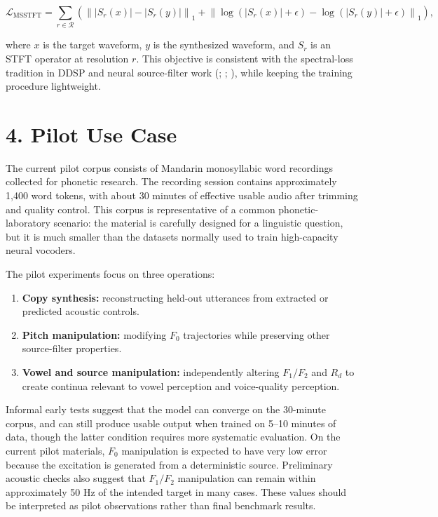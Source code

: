 \documentclass[
  10pt,
]{article}
\providecommand{\tightlist}{%
  \setlength{\itemsep}{0pt}\setlength{\parskip}{0pt}}
\begin{document}
\[
\mathcal{L}_{\mathrm{MSSTFT}}
=
\sum_{r\in\mathcal{R}}
\left(
\left\| |S_r(x)|-|S_r(y)| \right\|_1
+
\left\| \log(|S_r(x)|+\epsilon)-\log(|S_r(y)|+\epsilon) \right\|_1
\right),
\]

where \(x\) is the target waveform, \(y\) is the synthesized waveform,
and \(S_r\) is an STFT operator at resolution \(r\). This objective is
consistent with the spectral-loss tradition in DDSP and neural
source-filter work (;
;
), while keeping the
training procedure lightweight.

\section{4. Pilot Use Case}\label{pilot-use-case}

The current pilot corpus consists of Mandarin monosyllabic word
recordings collected for phonetic research. The recording session
contains approximately 1,400 word tokens, with about 30 minutes of
effective usable audio after trimming and quality control. This corpus
is representative of a common phonetic-laboratory scenario: the material
is carefully designed for a linguistic question, but it is much smaller
than the datasets normally used to train high-capacity neural vocoders.

The pilot experiments focus on three operations:

\begin{enumerate}
\def\labelenumi{\arabic{enumi}.}
\tightlist
\item
  \textbf{Copy synthesis:} reconstructing held-out utterances from
  extracted or predicted acoustic controls.
\item
  \textbf{Pitch manipulation:} modifying \(F_0\) trajectories while
  preserving other source-filter properties.
\item
  \textbf{Vowel and source manipulation:} independently altering
  \(F_1/F_2\) and \(R_d\) to create continua relevant to vowel
  perception and voice-quality perception.
\end{enumerate}

Informal early tests suggest that the model can converge on the
30-minute corpus, and can still produce usable output when trained on
5--10 minutes of data, though the latter condition requires more
systematic evaluation. On the current pilot materials, \(F_0\)
manipulation is expected to have very low error because the excitation
is generated from a deterministic source. Preliminary acoustic checks
also suggest that \(F_1/F_2\) manipulation can remain within
approximately 50 Hz of the intended target in many cases. These values
should be interpreted as pilot observations rather than final benchmark
results.
\end{document}
